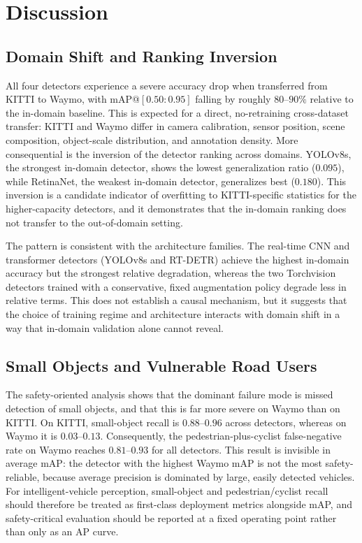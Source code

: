 \section{Discussion}
\label{sec:discussion}

\subsection{Domain Shift and Ranking Inversion}
\label{sec:discussion_shift}

All four detectors experience a severe accuracy drop when transferred from KITTI to Waymo,
with mAP@$[0.50{:}0.95]$ falling by roughly $80$--$90\%$ relative to the in-domain
baseline. This is expected for a direct, no-retraining cross-dataset transfer: KITTI and
Waymo differ in camera calibration, sensor position, scene composition, object-scale
distribution, and annotation density. More consequential is the inversion of the detector
ranking across domains. YOLOv8s, the strongest in-domain detector, shows the lowest
generalization ratio ($0.095$), while RetinaNet, the weakest in-domain detector, generalizes
best ($0.180$). This inversion is a candidate indicator of overfitting to KITTI-specific
statistics for the higher-capacity detectors, and it demonstrates that the in-domain
ranking does not transfer to the out-of-domain setting.

The pattern is consistent with the architecture families. The real-time CNN and transformer
detectors (YOLOv8s and RT-DETR) achieve the highest in-domain accuracy but the strongest
relative degradation, whereas the two Torchvision detectors trained with a conservative,
fixed augmentation policy degrade less in relative terms. This does not establish a causal
mechanism, but it suggests that the choice of training regime and architecture interacts
with domain shift in a way that in-domain validation alone cannot reveal.

\subsection{Small Objects and Vulnerable Road Users}
\label{sec:discussion_safety}

The safety-oriented analysis shows that the dominant failure mode is missed detection of
small objects, and that this is far more severe on Waymo than on KITTI. On KITTI,
small-object recall is $0.88$--$0.96$ across detectors, whereas on Waymo it is
$0.03$--$0.13$. Consequently, the pedestrian-plus-cyclist false-negative rate on Waymo
reaches $0.81$--$0.93$ for all detectors. This result is invisible in average mAP: the
detector with the highest Waymo mAP is not the most safety-reliable, because average
precision is dominated by large, easily detected vehicles. For intelligent-vehicle
perception, small-object and pedestrian/cyclist recall should therefore be treated as
first-class deployment metrics alongside mAP, and safety-critical evaluation should be
reported at a fixed operating point rather than only as an AP curve.

